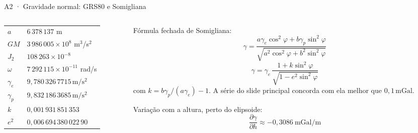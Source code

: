 \documentclass[aspectratio=169,11pt]{beamer}
\newcommand{\mGal}{\ensuremath{\,\mathrm{mGal}}\xspace}
\newcommand{\mss}{\ensuremath{\,\mathrm{m/s^2}}\xspace}
\begin{document}
\begin{frame}{A2 · Gravidade normal: GRS80 e Somigliana}
  \small
  \begin{columns}[T]
    \begin{column}{0.48\textwidth}
      \centering
      \renewcommand{\arraystretch}{1.25}
      \begin{tabular}{ll}
        \toprule
        $a$ & $6\,378\,137$ m \\
        $GM$ & $3\,986\,005 \times 10^{8}$ m$^3$/s$^2$ \\
        $J_2$ & $108\,263 \times 10^{-8}$ \\
        $\omega$ & $7\,292\,115 \times 10^{-11}$ rad/s \\
        \midrule
        $\gamma_e$ & $9{,}780\,326\,7715$\mss \\
        $\gamma_p$ & $9{,}832\,186\,3685$\mss \\
        $k$ & $0{,}001\,931\,851\,353$ \\
        $e^2$ & $0{,}006\,694\,380\,022\,90$ \\
        \bottomrule
      \end{tabular}
    \end{column}
    \begin{column}{0.48\textwidth}
      Fórmula fechada de Somigliana:
      \[ \gamma = \frac{a\gamma_e\cos^2\varphi + b\gamma_p\sin^2\varphi}
                       {\sqrt{a^2\cos^2\varphi + b^2\sin^2\varphi}} \]
      \[ \gamma = \gamma_e\,\frac{1 + k\sin^2\varphi}{\sqrt{1 - e^2\sin^2\varphi}} \]
      com $k = b\gamma_p/(a\gamma_e) - 1$. A série do slide principal concorda com ela
      melhor que $0{,}1$\mGal.
      \medskip

      Variação com a altura, perto do elipsoide:
      \[ \frac{\partial\gamma}{\partial h} \approx -0{,}3086 \ \text{mGal/m} \]
    \end{column}
  \end{columns}
\end{frame}
\end{document}
